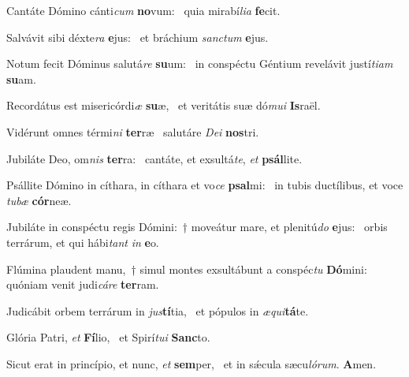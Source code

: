 \item Cantáte Dómino cánti\textit{cum} \textbf{no}vum:~\psstar{} quia mirabí\textit{lia} \textbf{fe}cit.
\item Salvávit sibi déxte\textit{ra} \textbf{e}jus:~\psstar{} et bráchium \textit{sanctum} \textbf{e}jus.
\item Notum fecit Dóminus salutá\textit{re} \textbf{su}um:~\psstar{} in conspéctu Géntium revelávit justí\textit{tiam} \textbf{su}am.
\item Recordátus est misericórdi\textit{æ} \textbf{su}æ,~\psstar{} et veritátis suæ dó\textit{mui} \textbf{Is}raël.
\item Vidérunt omnes térmi\textit{ni} \textbf{ter}ræ~\psstar{} salutáre \textit{Dei} \textbf{nos}tri.
\item Jubiláte Deo, om\textit{nis} \textbf{ter}ra:~\psstar{} cantáte, et exsultá\textit{te}, \textit{et} \textbf{psál}lite.
\item Psállite Dómino in cíthara, in cíthara et vo\textit{ce} \textbf{psal}mi:~\psstar{} in tubis ductílibus, et voce \textit{tubæ} \textbf{cór}neæ.
\item Jubiláte in conspéctu regis Dómini:~† moveátur mare, et plenitú\textit{do} \textbf{e}jus:~\psstar{} orbis terrárum, et qui hábi\textit{tant} \textit{in} \textbf{e}o.
\item Flúmina plaudent manu,~† simul montes exsultábunt a conspéc\textit{tu} \textbf{Dó}mini:~\psstar{} quóniam venit judi\textit{cáre} \textbf{ter}ram.
\item Judicábit orbem terrárum in \textit{jus}\textbf{tí}tia,~\psstar{} et pópulos in \textit{æqui}\textbf{tá}te.
\item Glória Patri, \textit{et} \textbf{Fí}lio,~\psstar{} et Spirí\textit{tui} \textbf{Sanc}to.
\item Sicut erat in princípio, et nunc, \textit{et} \textbf{sem}per,~\psstar{} et in sǽcula sæcu\textit{lórum}. \textbf{A}men.